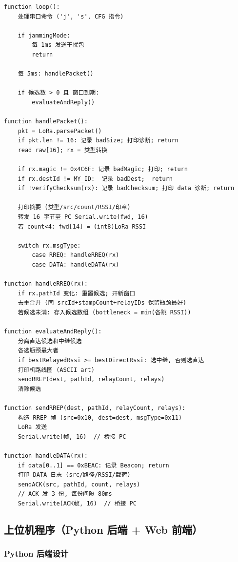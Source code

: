\documentclass[12pt,a4paper]{ctexart}
\begin{document}
\begin{lstlisting}[]
function loop():
    处理串口命令 ('j', 's', CFG 指令)

    if jammingMode:
        每 1ms 发送干扰包
        return

    每 5ms: handlePacket()

    if 候选数 > 0 且 窗口到期:
        evaluateAndReply()

function handlePacket():
    pkt = LoRa.parsePacket()
    if pkt.len != 16: 记录 badSize; 打印诊断; return
    read raw[16]; rx = 类型转换

    if rx.magic != 0x4C6F: 记录 badMagic; 打印; return
    if rx.destId != MY_ID:  记录 badDest;  return
    if !verifyChecksum(rx): 记录 badChecksum; 打印 data 诊断; return

    打印摘要 (类型/src/count/RSSI/印章)
    转发 16 字节至 PC Serial.write(fwd, 16)
    若 count<4: fwd[14] = (int8)LoRa RSSI

    switch rx.msgType:
        case RREQ: handleRREQ(rx)
        case DATA: handleDATA(rx)

function handleRREQ(rx):
    if rx.pathId 变化: 重置候选; 开新窗口
    去重合并 (同 srcId+stampCount+relayIDs 保留瓶颈最好)
    若候选未满: 存入候选数组 (bottleneck = min(各跳 RSSI))

function evaluateAndReply():
    分离直达候选和中继候选
    各选瓶颈最大者
    if bestRelayedRssi >= bestDirectRssi: 选中继, 否则选直达
    打印机路线图 (ASCII art)
    sendRREP(dest, pathId, relayCount, relays)
    清除候选

function sendRREP(dest, pathId, relayCount, relays):
    构造 RREP 帧 (src=0x10, dest=dest, msgType=0x11)
    LoRa 发送
    Serial.write(帧, 16)  // 桥接 PC

function handleDATA(rx):
    if data[0..1] == 0xBEAC: 记录 Beacon; return
    打印 DATA 日志 (src/路径/RSSI/载荷)
    sendACK(src, pathId, count, relays)
    // ACK 发 3 份, 每份间隔 80ms
    Serial.write(ACK帧, 16)  // 桥接 PC
\end{lstlisting}

\subsection{上位机程序（Python 后端 + Web 前端）}

\subsubsection{Python 后端设计}
\end{document}
